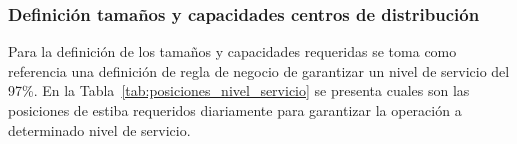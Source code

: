 \documentclass[fleqn, 11pt,letterpaper]{article}
\begin{document}
\begin{table}[H]
\centering
\caption{Estadísticos de demanda y cálculo del stock de seguridad por CEDI}
\label{tab:stock_seguridad}
\small
\setlength{\tabcolsep}{4pt}
\renewcommand{\arraystretch}{1.25}
\end{table}

\subsubsection{Definición tamaños y capacidades centros de distribución}

Para la definición de los tamaños y capacidades requeridas se toma como referencia una definición de regla de negocio de garantizar un nivel de servicio del 97\%. En la Tabla~\ref{tab:posiciones_nivel_servicio} se presenta cuales son las posiciones de estiba requeridos diariamente para garantizar la operación a determinado nivel de servicio.
\end{document}

